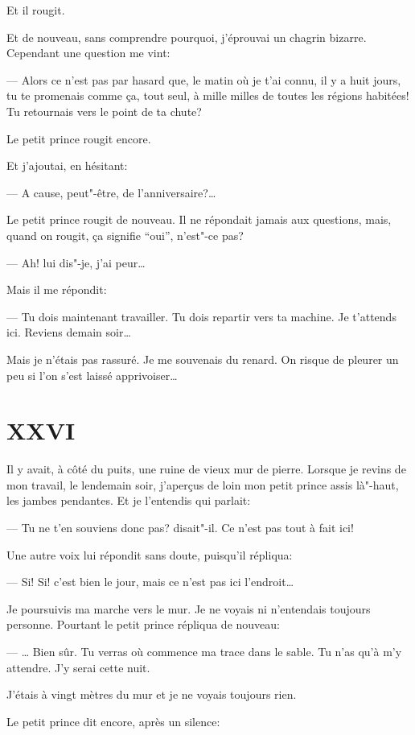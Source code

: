 Et il rougit.

Et de nouveau, sans comprendre pourquoi, j'éprouvai un chagrin bizarre. Cependant
une question me vint:

--- Alors ce n'est pas par hasard que, le matin où je t'ai connu, il y a huit jours,
tu te promenais comme ça, tout seul, à mille milles de toutes les régions habitées!
Tu retournais vers le point de ta chute?

Le petit prince rougit encore.

Et j'ajoutai, en hésitant:

--- A cause, peut"-être, de l'anniversaire?\ldots{}

Le petit prince rougit de nouveau. Il ne répondait jamais aux questions, mais, quand
on rougit, ça signifie ``oui'', n'est"-ce pas?

--- Ah! lui dis"-je, j'ai peur\ldots{}

Mais il me répondit:

--- Tu dois maintenant travailler. Tu dois repartir vers ta machine. Je t'attends ici.
Reviens demain soir\ldots{}

Mais je n'étais pas rassuré. Je me souvenais du renard. On risque de pleurer un peu
si l'on s'est laissé apprivoiser\ldots{}

\section{XXVI}

Il y avait, à côté du puits, une ruine de vieux mur de pierre. Lorsque je
revins de mon travail, le lendemain soir, j'aperçus de loin mon petit prince
assis là"-haut, les jambes pendantes. Et je l'entendis qui parlait:

--- Tu ne t'en souviens donc pas? disait"-il. Ce n'est pas tout à fait ici!

Une autre voix lui répondit sans doute, puisqu'il répliqua:

--- Si! Si! c'est bien le jour, mais ce n'est pas ici l'endroit\ldots{}

Je poursuivis ma marche vers le mur. Je ne voyais ni n'entendais toujours
personne. Pourtant le petit prince répliqua de nouveau:

--- \ldots{} Bien sûr. Tu verras où commence ma trace dans le sable. Tu n'as
qu’à m'y attendre. J'y serai cette nuit.

J'étais à vingt mètres du mur et je ne voyais toujours rien.

Le petit prince dit encore, après un silence:

